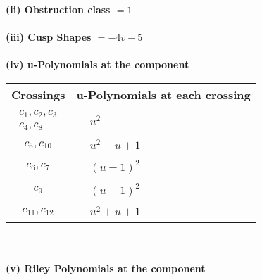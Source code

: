 \documentclass[1p]{elsarticle_modified}
\theoremstyle{definition}
\begin{document}
\flushleft \textbf{(ii) Obstruction class $= 1$}\\~\\
\flushleft \textbf{(iii) Cusp Shapes $= -4 v-5$}\\~\\
\newpage\renewcommand{\arraystretch}{1}
\flushleft \textbf{(iv) u-Polynomials at the component}\newline \\
\begin{tabular}{m{50pt}|m{274pt}}
Crossings & \hspace{64pt}u-Polynomials at each crossing \\
\hline $$\begin{aligned}c_{1},c_{2},c_{3}\\c_{4},c_{8}\end{aligned}$$&$\begin{aligned}
&u^2
\end{aligned}$\\
\hline $$\begin{aligned}c_{5},c_{10}\end{aligned}$$&$\begin{aligned}
&u^2- u+1
\end{aligned}$\\
\hline $$\begin{aligned}c_{6},c_{7}\end{aligned}$$&$\begin{aligned}
&(u-1)^2
\end{aligned}$\\
\hline $$\begin{aligned}c_{9}\end{aligned}$$&$\begin{aligned}
&(u+1)^2
\end{aligned}$\\
\hline $$\begin{aligned}c_{11},c_{12}\end{aligned}$$&$\begin{aligned}
&u^2+u+1
\end{aligned}$\\
\hline
\end{tabular}\\~\\
\newpage\renewcommand{\arraystretch}{1}
\flushleft \textbf{(v) Riley Polynomials at the component}\newline \\
\end{document}
